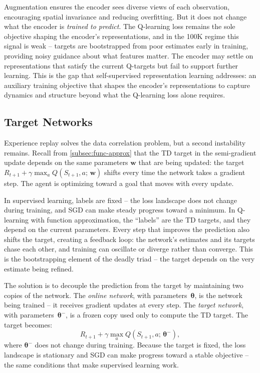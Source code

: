 \smallskip
Augmentation ensures the encoder sees diverse views of each
observation, encouraging spatial invariance and reducing
overfitting. But it does not change what the encoder is
\emph{trained to predict}. The Q-learning loss remains the sole
objective shaping the encoder's representations, and in the 100K
regime this signal is weak -- targets are bootstrapped from poor
estimates early in training, providing noisy guidance about what
features matter. The encoder may settle on representations that
satisfy the current Q-targets but fail to support further learning.
This is the gap that self-supervised representation learning
addresses: an auxiliary training objective that shapes the
encoder's representations to capture dynamics and structure beyond
what the Q-learning loss alone requires.

\subsection{Target Networks}
\label{subsec:target-networks-bg}

Experience replay solves the data correlation problem, but a second
instability remains. Recall from \cref{subsec:func-approx} that the
TD target in the semi-gradient update depends on the same parameters
$\mathbf{w}$ that are being updated: the target
$R_{t+1} + \gamma \max_a Q(S_{t+1}, a;\, \mathbf{w})$ shifts every
time the network takes a gradient step. The agent is optimizing
toward a goal that moves with every update.

\smallskip
In supervised learning, labels are fixed -- the loss landscape does
not change during training, and SGD can make steady progress toward
a minimum. In Q-learning with function approximation, the
``labels'' are the TD targets, and they depend on the current
parameters. Every step that improves the prediction also shifts the
target, creating a feedback loop: the network's estimates and its
targets chase each other, and training can oscillate or diverge
rather than converge. This is the bootstrapping element of the
deadly triad -- the target depends on the very estimate being
refined.

\smallskip
The solution is to decouple the prediction from the target by
maintaining two copies of the network. The \emph{online network},
with parameters~$\boldsymbol{\theta}$, is the network being
trained -- it receives gradient updates at every step. The
\emph{target network}, with parameters~$\boldsymbol{\theta}^-$, is
a frozen copy used only to compute the TD target. The target
becomes:
%
\[
R_{t+1} + \gamma \max_{a} Q(S_{t+1}, a;\,
  \boldsymbol{\theta}^-),
\]
%
where $\boldsymbol{\theta}^-$ does not change during training.
Because the target is fixed, the loss landscape is stationary and
SGD can make progress toward a stable objective -- the same
conditions that make supervised learning work.

